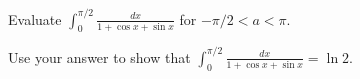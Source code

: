 Evaluate $\displaystyle \int_0^{\pi/2} \frac{dx}{1 + \cos x + \sin x}$ for
$-\pi/2 < a < \pi$.

Use your answer to show that $\displaystyle \int_0^{\pi/2} \frac{dx}{1 + \cos x +
\sin x} = \ln 2$.
